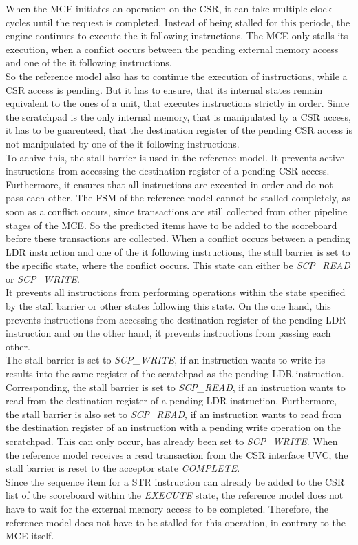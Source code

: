 When the MCE initiates an operation on the CSR, it can take multiple clock cycles until the request is completed.
Instead of being stalled for this periode, the engine continues to execute the it following instructions.
The MCE only stalls its execution, when a conflict occurs between the pending external memory access and one of the it following instructions.\\
So the reference model also has to continue the execution of instructions, while a CSR access is pending.
But it has to ensure, that its internal states remain equivalent to the ones of a unit, that executes instructions strictly in order.
Since the scratchpad is the only internal memory, that is manipulated by a CSR access, it has to be guarenteed, that the destination register of the pending CSR
access is not manipulated by one of the it following instructions.\\
To achive this, the stall barrier is used in the reference model. It prevents active instructions from accessing the destination register of a pending CSR
access. Furthermore, it ensures that all instructions are executed in order and do not pass each other.
The FSM of the reference model cannot be stalled completely, as soon as a conflict occurs, since transactions are still collected from other pipeline stages of
the MCE.
So the predicted items have to be added to the scoreboard before these transactions are collected.
When a conflict occurs between a pending LDR instruction and one of the it following instructions, the stall barrier is set to the specific state,
where the conflict occurs.
This state can either be \emph{SCP\_READ} or \emph{SCP\_WRITE}.\\
It prevents all instructions from performing operations within the state specified by the stall barrier or other states following this state.
On the one hand, this prevents instructions from accessing the destination register of the pending LDR instruction and on the other hand, it prevents
instructions from passing each other.\\
The stall barrier is set to \emph{SCP\_WRITE}, if an instruction wants to write its results into the same register of the scratchpad as the pending LDR
instruction.
Corresponding, the stall barrier is set to \emph{SCP\_READ}, if an instruction wants to read from the destination register of a pending LDR instruction.
Furthermore, the stall barrier is also set to \emph{SCP\_READ}, if an instruction wants to read from the destination register of an instruction with a pending
write operation on the scratchpad. This can only occur, has already been set to \emph{SCP\_WRITE}.
When the reference model receives a read transaction from the CSR interface UVC, the stall barrier is reset to the acceptor state \emph{COMPLETE}.\\
Since the sequence item for a STR instruction can already be added to the CSR list of the scoreboard within the \emph{EXECUTE} state, the reference model does
not have to wait for the external memory access to be completed.
Therefore, the reference model does not have to be stalled for this operation, in contrary to the MCE itself.

